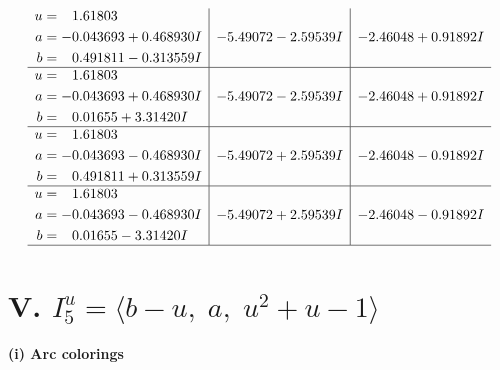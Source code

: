 \documentclass[1p]{elsarticle_modified}
\theoremstyle{definition}
\begin{document}
$$\begin{array}{c|c|c}
\begin{aligned}
u &= \phantom{-}1.61803\phantom{ +0.000000I} \\
a &= -0.043693 + 0.468930 I \\
b &= \phantom{-}0.491811 - 0.313559 I\end{aligned}
 & -5.49072 - 2.59539 I & -2.46048 + 0.91892 I \\ \hline\begin{aligned}
u &= \phantom{-}1.61803\phantom{ +0.000000I} \\
a &= -0.043693 + 0.468930 I \\
b &= \phantom{-}0.01655 + 3.31420 I\end{aligned}
 & -5.49072 - 2.59539 I & -2.46048 + 0.91892 I \\ \hline\begin{aligned}
u &= \phantom{-}1.61803\phantom{ +0.000000I} \\
a &= -0.043693 - 0.468930 I \\
b &= \phantom{-}0.491811 + 0.313559 I\end{aligned}
 & -5.49072 + 2.59539 I & -2.46048 - 0.91892 I \\ \hline\begin{aligned}
u &= \phantom{-}1.61803\phantom{ +0.000000I} \\
a &= -0.043693 - 0.468930 I \\
b &= \phantom{-}0.01655 - 3.31420 I\end{aligned}
 & -5.49072 + 2.59539 I & -2.46048 - 0.91892 I\\
 \hline 
 \end{array}$$\newpage\newpage\renewcommand{\arraystretch}{1}
\centering \section*{V. $I^u_{5}= \langle b- u,\;a,\;u^2+u-1 \rangle$}
\flushleft \textbf{(i) Arc colorings}\\
\end{document}
